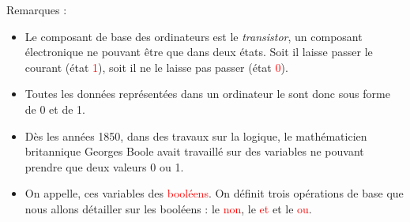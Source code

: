 \documentclass[10pt]{beamer}
\begin{document}
\begin{frame}
	\mframe{\Arch}
	\begin{block}{Remarques :}
		\begin{itemize}
			\item<1-> Le composant de base des ordinateurs est le \textit{transistor}, un composant électronique ne pouvant être que dans deux états. Soit il laisse passer le courant (état \textcolor{red}{1}), soit il ne le laisse pas passer (état \textcolor{red}{0}).
			\item<2-> Toutes les données représentées dans un ordinateur le sont donc sous forme de 0 et de 1.
			\item<3-> Dès les années 1850, dans des travaux sur la logique, le mathématicien britannique Georges Boole avait travaillé sur des variables ne pouvant prendre que deux valeurs 0  ou 1.
			\item<4-> On appelle, ces variables des \textcolor{red}{booléens}. On définit trois opérations de base que nous allons détailler sur les booléens : le \textcolor{red}{non}, le \textcolor{red}{et} et le \textcolor{red}{ou}.
		\end{itemize}
	\end{block}
\end{frame}
\end{document}
